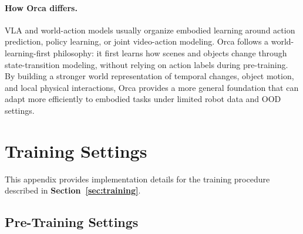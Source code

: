 \documentclass{llmxive}
\providecommand{\currentnavsection}{sec:intro}
\providecommand{\setnavsection}[1]{  \gdef\currentnavsection{#1}}
\providecommand{\thefigure}{A\arabic{figure}}
\providecommand{\theHfigure}{A\arabic{figure}}
\providecommand{\thetable}{A\arabic{table}}
\providecommand{\theHtable}{A\arabic{table}}
\providecommand{\theequation}{C-\arabic{equation}}
\providecommand{\theHequation}{C-\arabic{equation}}
\begin{document}
\vspace{-0.5em}
\paragraph{How Orca differs.}
VLA and world-action models usually organize embodied learning around action prediction, policy learning, or joint video-action modeling.
Orca follows a world-learning-first philosophy: it first learns how scenes and objects change through state-transition modeling, without relying on action labels during pre-training.
By building a stronger world representation of temporal changes, object motion, and local physical interactions, Orca provides a more general foundation that can adapt more efficiently to embodied tasks under limited robot data and OOD settings.
\section{Training Settings}
\setnavsection{sec:appendix_training}
\label{sec:appendix_training}

\renewcommand{\thefigure}{C\arabic{figure}}
\renewcommand{\theHfigure}{C\arabic{figure}}
\setcounter{figure}{0}

\renewcommand{\thetable}{C\arabic{table}}
\renewcommand{\theHtable}{C\arabic{table}}
\setcounter{table}{0}

\renewcommand{\theequation}{C-\arabic{equation}}
\renewcommand{\theHequation}{C-\arabic{equation}}
\setcounter{equation}{0}

This appendix provides implementation details for the training procedure described in \textbf{Section~\ref{sec:training}}. 



\subsection{Pre-Training Settings}
\label{sec:appendix_pretraining_settings}
\end{document}
